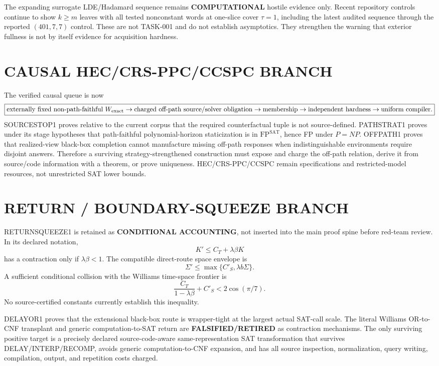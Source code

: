 \documentclass[11pt]{article}
\begin{document}
The expanding surrogate LDE/Hadamard sequence remains \textbf{COMPUTATIONAL} hostile evidence only. Recent repository controls continue to show \(k\ge m\) leaves with all tested nonconstant words at one-slice cover \(\tau=1\), including the latest audited sequence through the reported \((401,7,7)\) control. These are not TASK-001 and do not establish asymptotics. They strengthen the warning that exterior fullness is not by itself evidence for acquisition hardness.

\section*{CAUSAL HEC/CRS-PPC/CCSPC BRANCH}
The verified causal queue is now
\[
\boxed{
\text{externally fixed non-path-faithful }W_{\rm exact}
\to
\text{charged off-path source/solver obligation}
\to
\text{membership}
\to
\text{independent hardness}
\to
\text{uniform compiler}.}
\]
SOURCESTOP1 proves relative to the current corpus that the required counterfactual tuple is not source-defined. PATHSTRAT1 proves under its stage hypotheses that path-faithful polynomial-horizon staticization is in \(\mathrm{FP}^{\mathrm{SAT}}\), hence FP under \(P=NP\). OFFPATH1 proves that realized-view black-box completion cannot manufacture missing off-path responses when indistinguishable environments require disjoint answers. Therefore a surviving strategy-strengthened construction must expose and charge the off-path relation, derive it from source/code information with a theorem, or prove uniqueness. HEC/CRS-PPC/CCSPC remain specifications and restricted-model resources, not unrestricted SAT lower bounds.

\section*{RETURN / BOUNDARY-SQUEEZE BRANCH}
RETURNSQUEEZE1 is retained as \textbf{CONDITIONAL ACCOUNTING}, not inserted into the main proof spine before red-team review. In its declared notation,
\[
K'\le C_T+\lambda\beta K
\]
has a contraction only if \(\lambda\beta<1\). The compatible direct-route space envelope is
\[
\Sigma'\le\max\{C'_S,\lambda b\Sigma\}.
\]
A sufficient conditional collision with the Williams time-space frontier is
\[
\frac{C_T}{1-\lambda\beta}+C'_S<2\cos(\pi/7).
\]
No source-certified constants currently establish this inequality.

DELAYOR1 proves that the extensional black-box route is wrapper-tight at the largest actual SAT-call scale. The literal Williams OR-to-CNF transplant and generic computation-to-SAT return are \textbf{FALSIFIED/RETIRED} as contraction mechanisms. The only surviving positive target is a precisely declared source-code-aware same-representation SAT transformation that survives DELAY/INTERP/RECOMP, avoids generic computation-to-CNF expansion, and has all source inspection, normalization, query writing, compilation, output, and repetition costs charged.
\end{document}
